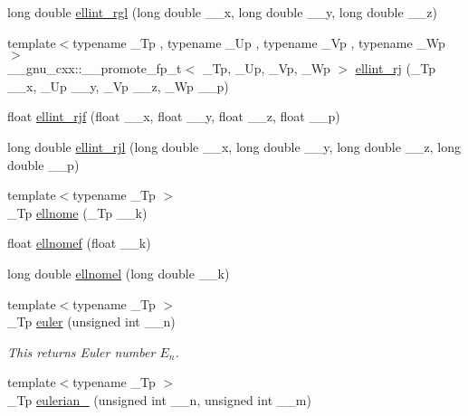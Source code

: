 \begin{DoxyCompactItemize}
\item 
long double \hyperlink{group__gnu__math__spec__func_ga563455d515ed845988552432108a21be}{ellint\+\_\+rgl} (long double \+\_\+\+\_\+x, long double \+\_\+\+\_\+y, long double \+\_\+\+\_\+z)
\item 
{\footnotesize template$<$typename \+\_\+\+Tp , typename \+\_\+\+Up , typename \+\_\+\+Vp , typename \+\_\+\+Wp $>$ }\\\+\_\+\+\_\+gnu\+\_\+cxx\+::\+\_\+\+\_\+promote\+\_\+fp\+\_\+t$<$ \+\_\+\+Tp, \+\_\+\+Up, \+\_\+\+Vp, \+\_\+\+Wp $>$ \hyperlink{group__gnu__math__spec__func_gaf9a96979913713963c5f4edeba8c7f5a}{ellint\+\_\+rj} (\+\_\+\+Tp \+\_\+\+\_\+x, \+\_\+\+Up \+\_\+\+\_\+y, \+\_\+\+Vp \+\_\+\+\_\+z, \+\_\+\+Wp \+\_\+\+\_\+p)
\item 
float \hyperlink{group__gnu__math__spec__func_gace85b5190b04f57493878c5d672cfabd}{ellint\+\_\+rjf} (float \+\_\+\+\_\+x, float \+\_\+\+\_\+y, float \+\_\+\+\_\+z, float \+\_\+\+\_\+p)
\item 
long double \hyperlink{group__gnu__math__spec__func_gab5405f1669b3ce8b560dc33aa5b97287}{ellint\+\_\+rjl} (long double \+\_\+\+\_\+x, long double \+\_\+\+\_\+y, long double \+\_\+\+\_\+z, long double \+\_\+\+\_\+p)
\item 
{\footnotesize template$<$typename \+\_\+\+Tp $>$ }\\\+\_\+\+Tp \hyperlink{group__gnu__math__spec__func_ga7bfb34f8b5c0ed7c72040f9cb7034bba}{ellnome} (\+\_\+\+Tp \+\_\+\+\_\+k)
\item 
float \hyperlink{group__gnu__math__spec__func_gad3ba08e5843ea0ec2bb9ddde3033adff}{ellnomef} (float \+\_\+\+\_\+k)
\item 
long double \hyperlink{group__gnu__math__spec__func_ga0774570b24f654f8ae39e1865613a4e2}{ellnomel} (long double \+\_\+\+\_\+k)
\item 
{\footnotesize template$<$typename \+\_\+\+Tp $>$ }\\\+\_\+\+Tp \hyperlink{group__gnu__math__spec__func_gac956e6457ab7d0d1765d281e73073f55}{euler} (unsigned int \+\_\+\+\_\+n)
\begin{DoxyCompactList}\small\item\em This returns Euler number $ E_n $. \end{DoxyCompactList}\item 
{\footnotesize template$<$typename \+\_\+\+Tp $>$ }\\\+\_\+\+Tp \hyperlink{group__gnu__math__spec__func_gadfd8810a97655d2cdd1b0e3af68a79d3}{eulerian\+\_} (unsigned int \+\_\+\+\_\+n, unsigned int \+\_\+\+\_\+m)

\end{DoxyCompactItemize}
